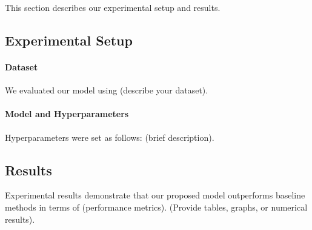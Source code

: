 This section describes our experimental setup and results.

\subsection{Experimental Setup}
\paragraph{Dataset}
We evaluated our model using (describe your dataset).

\paragraph{Model and Hyperparameters}
Hyperparameters were set as follows: (brief description).

\subsection{Results}
Experimental results demonstrate that our proposed model outperforms baseline methods in terms of (performance metrics). (Provide tables, graphs, or numerical results).
